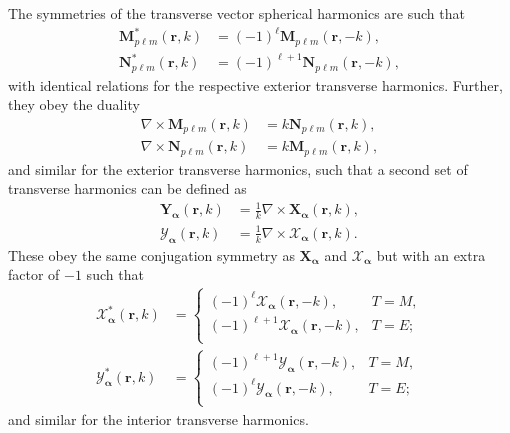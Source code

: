 \documentclass{article}
\begin{document}
The symmetries of the transverse vector spherical harmonics are such that
\begin{equation}
\begin{split}
\mathbf{M}_{p\ell m}^*(\mathbf{r},k) &= (-1)^\ell\mathbf{M}_{p\ell m}(\mathbf{r},-k),\\
\mathbf{N}_{p\ell m}^*(\mathbf{r},k) &= (-1)^{\ell + 1}\mathbf{N}_{p\ell m}(\mathbf{r},-k),
\end{split}
\end{equation}
with identical relations for the respective exterior transverse harmonics. Further, they obey the duality
\begin{equation}
\begin{split}
\nabla\times\mathbf{M}_{p\ell m}(\mathbf{r},k) &= k\mathbf{N}_{p\ell m}(\mathbf{r},k),\\
\nabla\times\mathbf{N}_{p\ell m}(\mathbf{r},k) &= k\mathbf{M}_{p\ell m}(\mathbf{r},k),
\end{split}
\end{equation}
and similar for the exterior transverse harmonics, such that a second set of transverse harmonics can be defined as 
\begin{equation}
\begin{split}
\mathbf{Y}_{\bm{\alpha}}(\mathbf{r},k) &= \frac{1}{k}\nabla\times\mathbf{X}_{\bm{\alpha}}(\mathbf{r},k),\\
\bm{\mathcal{Y}}_{\bm{\alpha}}(\mathbf{r},k) &= \frac{1}{k}\nabla\times\bm{\mathcal{X}}_{\bm{\alpha}}(\mathbf{r},k).
\end{split}
\end{equation}
These obey the same conjugation symmetry as $\mathbf{X}_{\bm{\alpha}}$ and $\bm{\mathcal{X}}_{\bm{\alpha}}$ but with an extra factor of $-1$ such that
\begin{equation}
\begin{split}
\bm{\mathcal{X}}_{\bm{\alpha}}^*(\mathbf{r},k) &= 
\begin{cases}
(-1)^{\ell}\bm{\mathcal{X}}_{\bm{\alpha}}(\mathbf{r},-k), & T = M,\\
(-1)^{\ell + 1}\bm{\mathcal{X}}_{\bm{\alpha}}(\mathbf{r},-k), & T = E;\\
\end{cases}\\
\bm{\mathcal{Y}}_{\bm{\alpha}}^*(\mathbf{r},k) &= 
\begin{cases}
(-1)^{\ell + 1}\bm{\mathcal{Y}}_{\bm{\alpha}}(\mathbf{r},-k), & T = M,\\
(-1)^{\ell}\bm{\mathcal{Y}}_{\bm{\alpha}}(\mathbf{r},-k), & T = E;\\
\end{cases}
\end{split}
\end{equation}
and similar for the interior transverse harmonics.
\end{document}
